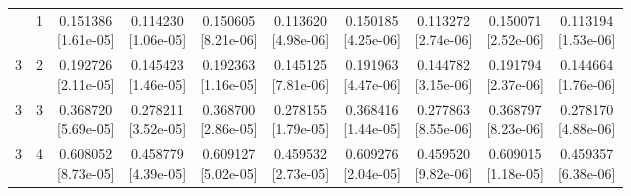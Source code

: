 \documentclass[12pt,letterpaper]{article}
\theoremstyle{plain}
\theoremstyle{definition}
\begin{document}
\begin{table}[p]
\begin{adjustbox}{max width=\linewidth}
\begin{tabular}{@{}rr*{8}{c}@{}}
\addlinespace[2pt]
3 & 1 & \shortstack{0.151386\\[-1pt]{\scriptsize[1.61e-05]}} & \shortstack{0.114230\\[-1pt]{\scriptsize[1.06e-05]}} & \shortstack{0.150605\\[-1pt]{\scriptsize[8.21e-06]}} & \shortstack{0.113620\\[-1pt]{\scriptsize[4.98e-06]}} & \shortstack{0.150185\\[-1pt]{\scriptsize[4.25e-06]}} & \shortstack{0.113272\\[-1pt]{\scriptsize[2.74e-06]}} & \shortstack{0.150071\\[-1pt]{\scriptsize[2.52e-06]}} & \shortstack{0.113194\\[-1pt]{\scriptsize[1.53e-06]}}\\
3 & 2 & \shortstack{0.192726\\[-1pt]{\scriptsize[2.11e-05]}} & \shortstack{0.145423\\[-1pt]{\scriptsize[1.46e-05]}} & \shortstack{0.192363\\[-1pt]{\scriptsize[1.16e-05]}} & \shortstack{0.145125\\[-1pt]{\scriptsize[7.81e-06]}} & \shortstack{0.191963\\[-1pt]{\scriptsize[4.47e-06]}} & \shortstack{0.144782\\[-1pt]{\scriptsize[3.15e-06]}} & \shortstack{0.191794\\[-1pt]{\scriptsize[2.37e-06]}} & \shortstack{0.144664\\[-1pt]{\scriptsize[1.76e-06]}}\\
3 & 3 & \shortstack{0.368720\\[-1pt]{\scriptsize[5.69e-05]}} & \shortstack{0.278211\\[-1pt]{\scriptsize[3.52e-05]}} & \shortstack{0.368700\\[-1pt]{\scriptsize[2.86e-05]}} & \shortstack{0.278155\\[-1pt]{\scriptsize[1.79e-05]}} & \shortstack{0.368416\\[-1pt]{\scriptsize[1.44e-05]}} & \shortstack{0.277863\\[-1pt]{\scriptsize[8.55e-06]}} & \shortstack{0.368797\\[-1pt]{\scriptsize[8.23e-06]}} & \shortstack{0.278170\\[-1pt]{\scriptsize[4.88e-06]}}\\
3 & 4 & \shortstack{0.608052\\[-1pt]{\scriptsize[8.73e-05]}} & \shortstack{0.458779\\[-1pt]{\scriptsize[4.39e-05]}} & \shortstack{0.609127\\[-1pt]{\scriptsize[5.02e-05]}} & \shortstack{0.459532\\[-1pt]{\scriptsize[2.73e-05]}} & \shortstack{0.609276\\[-1pt]{\scriptsize[2.04e-05]}} & \shortstack{0.459520\\[-1pt]{\scriptsize[9.82e-06]}} & \shortstack{0.609015\\[-1pt]{\scriptsize[1.18e-05]}} & \shortstack{0.459357\\[-1pt]{\scriptsize[6.38e-06]}}\\

\end{tabular}
\end{adjustbox}
\end{table}
\end{document}

